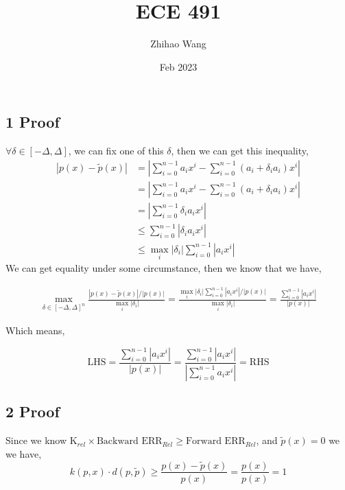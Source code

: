\documentclass{article}
\title{ECE 491}
\author{Zhihao Wang}
\date{Feb 2023}
\begin{document}
\maketitle

\subsection*{1 Proof}
$\forall \delta \in [-\Delta, \Delta]$, we can fix one of this $\delta$, then we can get this inequality, 
\[
\begin{split}
|p(x) - \tilde{p}(x)| &= |\sum \limits_{i=0}^{n-1} a_ix^i - \sum \limits_{i=0}^{n-1} (a_i + \delta_ia_i)x^i| \\ 
&=|\sum \limits_{i=0}^{n-1} a_ix^i - \sum \limits_{i=0}^{n-1} (a_i + \delta_ia_i)x^i| \\ 
&=|\sum \limits_{i=0}^{n-1} \delta_ia_ix^i| \\
&\le \sum \limits_{i=0}^{n-1}| \delta_ia_ix^i|  \\
&\le \max_i |\delta_i|  \sum \limits_{i=0}^{n-1}| a_ix^i| 
\end{split}
\]
We can get equality under some circumstance, then we know that we have,

\[
\begin{split}
\max \limits_{\delta \in [-\Delta, \Delta]^n} \frac{|p(x) - \tilde{p}(x)| / |p(x)|}{\max_i |\delta_i|} =  \frac{\max_i |\delta_i|  \sum \limits_{i=0}^{n-1}| a_ix^i|  / |p(x)|}{ \max_i |\delta_i|}  = \frac{\sum \limits_{i=0}^{n-1}| a_ix^i| }{|p(x)|}
\end{split}
\]

Which means,

$$\text{LHS} = \frac{\sum \limits_{i=0}^{n-1}| a_ix^i| }{|p(x)|} =  \frac{\sum \limits_{i=0}^{n-1}| a_ix^i| }{|\sum \limits_{i=0}^{n-1} a_ix^i |} = \text{RHS}$$

\subsection*{2 Proof}





Since we know $\text{K}_{rel} \times \text{Backward ERR}_{Rel} \ge \text{Forward ERR}_{Rel} $, and $\tilde p(x) = 0$ we we have, 
$$k(p, x) \cdot d(p, \tilde p) \ge \frac{p(x) - \tilde p(x)}{p(x)} = \frac{p(x)}{p(x)} = 1$$
\end{document}
